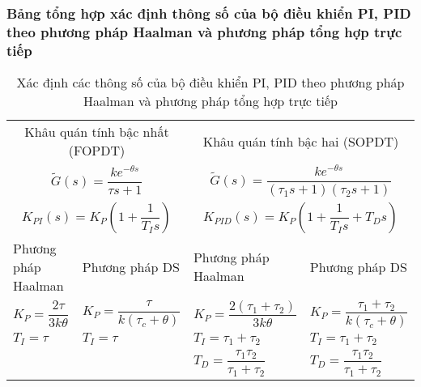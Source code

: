 \subsubsection{Bảng tổng hợp xác định thông số của bộ điều khiển PI, PID theo phương pháp Haalman và phương pháp tổng hợp trực tiếp}
    \begin{table}[htp]
        \begin{center}
            \begin{tabular}{llll}
                \toprule
                \multicolumn{2}{c}{Khâu quán tính bậc nhất (FOPDT)} & \multicolumn{2}{c}{Khâu quán tính bậc hai (SOPDT)} \\
                \multicolumn{2}{c}{$\tilde{G}(s) = \dfrac{k e^{-\theta s}}{\tau s + 1}$} & \multicolumn{2}{c}{$\tilde{G}(s) = \dfrac{k e^{-\theta s}}{\left({\tau_1 s + 1}\right) \left({\tau_2 s + 1}\right)}$} \\
                \multicolumn{2}{c}{$K_{PI}(s) = K_P \left({1 + \dfrac{1}{T_I s}}\right)$} & \multicolumn{2}{c}{$K_{PID}(s) = K_P \left({1 + \dfrac{1}{T_I s} + T_D s}\right)$} \\
                \midrule
                Phương pháp Haalman & Phương pháp DS & Phương pháp Haalman & Phương pháp DS \\
                \midrule
                $K_P = \dfrac{2 \tau}{3 k \theta}$ & $K_P = \dfrac{\tau}{k\left({\tau_c + \theta}\right)}$  & $K_P = \dfrac{2 \left({\tau_1 + \tau_2}\right)}{3 k \theta}$ & $K_P = \dfrac{\tau_1 + \tau_2}{k\left({\tau_c + \theta}\right)}$ \\
                $T_I = \tau$ & $T_I = \tau$ & $T_I = \tau_1 + \tau_2$ & $T_I = \tau_1 + \tau_2$ \\
                & & $T_D = \dfrac{\tau_1 \tau_2}{\tau_1 + \tau_2}$ & $T_D = \dfrac{\tau_1 \tau_2}{\tau_1 + \tau_2}$ \\
                \bottomrule
            \end{tabular}
        \end{center}
        \caption{Xác định các thông số của bộ điều khiển PI, PID theo phương pháp Haalman và phương pháp tổng hợp trực tiếp}
    \end{table}
